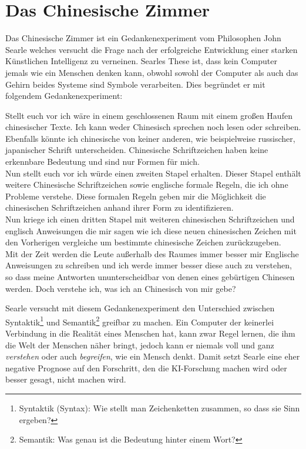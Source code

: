\documentclass[12pt,german,ngerman]{report}
\begin{document}
    \section{Das Chinesische Zimmer}
    Das Chinesische Zimmer ist ein Gedankenexperiment vom Philosophen John Searle welches
    versucht die Frage nach der erfolgreiche Entwicklung einer starken Künstlichen Intelligenz zu verneinen.
    Searles These ist, dass kein Computer jemals wie ein Menschen denken kann,
    obwohl sowohl der Computer als auch das Gehirn beides Systeme sind Symbole verarbeiten.\cite{nimtz2013chinesische}
    Dies begründet er mit folgendem Gedankenexperiment:
    \begin{displayquote}
        Stellt euch vor ich wäre in einem geschlossenen Raum mit einem großen Haufen chinesischer Texte.
        Ich kann weder Chinesisch sprechen noch lesen oder schreiben.
        Ebenfalls könnte ich chinesische von keiner anderen, wie beispielweise russischer, japanischer Schrift unterscheiden.
        Chinesische Schriftzeichen haben keine erkennbare Bedeutung und sind nur Formen für mich.\\

        Nun stellt euch vor ich würde einen zweiten Stapel erhalten. Dieser Stapel enthält weitere
        Chinesische Schriftzeichen sowie englische formale Regeln, die ich ohne Probleme verstehe.
        Diese formalen Regeln geben mir die Möglichkeit die chinesischen Schriftzeichen
        anhand ihrer Form zu identifizieren.\\

        Nun kriege ich einen dritten Stapel mit weiteren chinesischen Schriftzeichen und englisch 
        Anweisungen die mir sagen wie ich
        diese neuen chinesischen Zeichen mit den Vorherigen vergleiche um bestimmte chinesische Zeichen zurückzugeben.\\

        Mit der Zeit werden die Leute außerhalb des Raumes immer besser mir Englische Anweisungen zu schreiben und
        ich werde immer besser diese auch zu verstehen, so dass meine Antworten ununterscheidbar von denen eines
        gebürtigen Chinesen werden. Doch verstehe ich, was ich an Chinesisch von mir gebe?
        \cite[1]{searle1999chinese}
    \end{displayquote}
    Searle versucht mit diesem Gedankenexperiment den Unterschied zwischen
    Syntaktik\footnote{Syntaktik (Syntax): Wie stellt man Zeichenketten zusammen, so dass sie Sinn ergeben?}
    und Semantik\footnote{Semantik: Was genau ist die Bedeutung hinter einem Wort?}
    greifbar zu machen.
    Ein Computer der keinerlei Verbindung in die Realität eines Menschen hat, kann zwar Regel lernen, die ihm die
    Welt der Menschen näher bringt, jedoch kann er niemals voll und ganz \emph{verstehen} oder auch \emph{begreifen},
    wie ein Mensch denkt. Damit setzt Searle eine eher negative Prognose auf den Forschritt, den die KI-Forschung
    machen wird oder besser gesagt, nicht machen wird.
\end{document}
